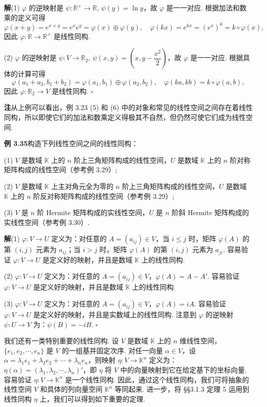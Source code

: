 \documentclass[UTF8,12pt,a4paper,fontset=fandol]{ctexart}
\begin{document}
\noindent\textbf{解}\quad (1) $\varphi$ 的逆映射是 $\psi:\mathbb{R}^+\to\mathbb{R}$, $\psi(y)=\ln y$，故 $\varphi$ 是一一对应. 根据加法和数乘的定义可得
\[
\varphi(x+y)=e^{x+y}=e^xe^y=\varphi(x)\oplus\varphi(y),\quad
\varphi(kx)=e^{kx}=(e^x)^k=k\circ\varphi(x),
\]
因此 $\varphi:\mathbb{R}\to\mathbb{R}^+$ 是线性同构.

(2) $\varphi$ 的逆映射是 $\psi:V\to\mathbb{R}_2$, $\psi(x,y)=\left(x,y-\dfrac{x^2}{2}\right)$，故 $\varphi$ 是一一对应. 根据具体的计算可得
\[
\varphi(a_1+a_2,b_1+b_2)=\varphi(a_1,b_1)\oplus\varphi(a_2,b_2),\quad
\varphi(ka,kb)=k\circ\varphi(a,b),
\]
因此 $\varphi:\mathbb{R}_2\to V$ 是线性同构. $\square$

\noindent\textbf{注}\quad 从上例可以看出，例 3.23 (5) 和 (6) 中的对象和常见的线性空间之间存在着线性同构，所以即使它们的加法和数乘定义得极其不自然，但仍然可使它们成为线性空间.

\noindent\textbf{例 3.35}\quad 构造下列线性空间之间的线性同构：

(1) $V$ 是数域 $\mathbb{K}$ 上的 $n$ 阶上三角矩阵构成的线性空间，$U$ 是数域 $\mathbb{K}$ 上的 $n$ 阶对称矩阵构成的线性空间（参考例 3.29）;

(2) $V$ 是数域 $\mathbb{K}$ 上主对角元全为零的 $n$ 阶上三角矩阵构成的线性空间，$U$ 是数域 $\mathbb{K}$ 上的 $n$ 阶反对称矩阵构成的线性空间（参考例 3.29）;

(3) $V$ 是 $n$ 阶 Hermite 矩阵构成的实线性空间，$U$ 是 $n$ 阶斜 Hermite 矩阵构成的实线性空间（参考例 3.30）.

\noindent\textbf{解}\quad (1) $\varphi:V\to U$ 定义为：对任意的 $A=(a_{ij})\in V$，当 $i\le j$ 时，矩阵 $\varphi(A)$ 的第 $(i,j)$ 元素为 $a_{ij}$；当 $i>j$ 时，矩阵 $\varphi(A)$ 的第 $(i,j)$ 元素为 $a_{ji}$. 容易验证 $\varphi:V\to U$ 是定义好的映射，并且是数域 $\mathbb{K}$ 上的线性同构.

(2) $\varphi:V\to U$ 定义为：对任意的 $A=(a_{ij})\in V$，$\varphi(A)=A-A'$. 容易验证 $\varphi:V\to U$ 是定义好的映射，并且是数域 $\mathbb{K}$ 上的线性同构.

(3) $\varphi:V\to U$ 定义为：对任意的 $A=(a_{ij})\in V$，$\varphi(A)=iA$. 容易验证 $\varphi:V\to U$ 是定义好的映射，并且是实数域上的线性同构. 注意到 $\varphi$ 的逆映射 $\psi:U\to V$ 为：$\psi(B)=-iB$. $\square$

我们还有一类特别重要的线性同构. 设 $V$ 是数域 $\mathbb{K}$ 上的 $n$ 维线性空间，$\{e_1,e_2,\cdots,e_n\}$ 是 $V$ 的一组基并固定次序. 对任一向量 $\alpha\in V$，设 $\alpha=\lambda_1e_1+\lambda_2e_2+\cdots+\lambda_ne_n$，则映射 $\eta:V\to\mathbb{K}^n$ 定义为：$\eta(\alpha)=(\lambda_1,\lambda_2,\cdots,\lambda_n)'$，即 $\eta$ 将 $V$ 中的向量映射到它在给定基下的坐标向量. 容易验证 $\eta:V\to\mathbb{K}^n$ 是一个线性同构. 因此，通过这个线性同构，我们可将抽象的线性空间 $V$ 和具体的列向量空间 $\mathbb{K}^n$ 等同起来. 进一步，将 §§3.1.3 定理 5 运用到线性同构 $\eta$ 上，我们可以得到如下重要的定理.
\end{document}
